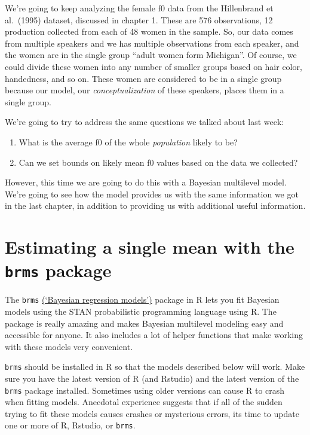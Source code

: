 \documentclass[
]{book}
\begin{document}
We're going to keep analyzing the female f0 data from the Hillenbrand et al.~(1995) dataset, discussed in chapter 1. These are 576 observations, 12 production collected from each of 48 women in the sample. So, our data comes from multiple speakers and we has multiple observations from each speaker, and the women are in the single group ``adult women form Michigan''. Of course, we could divide these women into any number of smaller groups based on hair color, handedness, and so on. These women are considered to be in a single group because our model, our \emph{conceptualization} of these speakers, places them in a single group.

We're going to try to address the same questions we talked about last week:

\begin{enumerate}
\def\labelenumi{\arabic{enumi})}
\item
  What is the average f0 of the whole \emph{population} likely to be?
\item
  Can we set bounds on likely mean f0 values based on the data we collected?
\end{enumerate}

However, this time we are going to do this with a Bayesian multilevel model. We're going to see how the model provides us with the same information we got in the last chapter, in addition to providing us with additional useful information.

\hypertarget{estimating-a-single-mean-with-the-brms-package}{%
\section{\texorpdfstring{Estimating a single mean with the \texttt{brms} package}{Estimating a single mean with the brms package}}\label{estimating-a-single-mean-with-the-brms-package}}

The \texttt{brms} \href{https://github.com/paul-buerkner/brms}{(`Bayesian regression models')} package in R lets you fit Bayesian models using the STAN probabilistic programming language using R. The package is really amazing and makes Bayesian multilevel modeling easy and accessible for anyone. It also includes a lot of helper functions that make working with these models very convenient.

\texttt{brms} should be installed in R so that the models described below will work. Make sure you have the latest version of R (and Rstudio) and the latest version of the \texttt{brms} package installed. Sometimes using older versions can cause R to crash when fitting models. Anecdotal experience suggests that if all of the sudden trying to fit these models causes crashes or mysterious errors, its time to update one or more of R, Rstudio, or \texttt{brms}.
\end{document}
